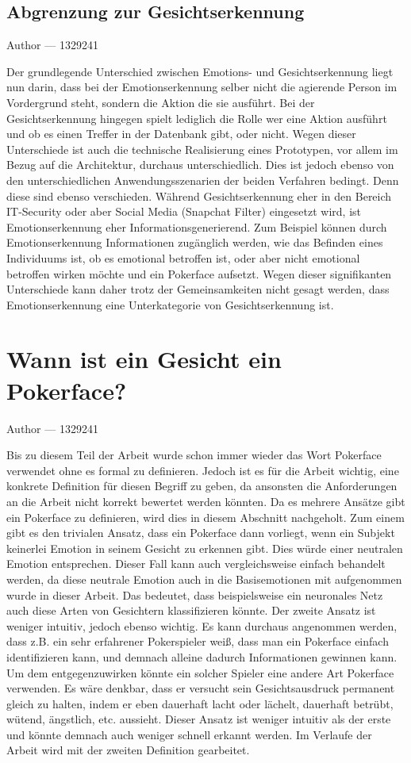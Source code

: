 \documentclass[12pt, a4paper]{report}
\makeatletter
\newcommand{\sectionauthor}[1]{%
  {\parindent0pt\vspace*{-5pt}%
  \large{Author --- }
  \linespread{1.1}\large\scshape#1%
  \par\nobreak\vspace*{35pt} }
  \@afterheading%
}
\makeatother
\begin{document}
\subsection{Abgrenzung zur Gesichtserkennung}
\sectionauthor{1329241}
Der grundlegende Unterschied zwischen Emotions- und Gesichtserkennung liegt nun darin, dass bei der Emotionserkennung selber nicht die agierende Person im Vordergrund steht, sondern die Aktion die sie ausführt. Bei der Gesichtserkennung hingegen spielt lediglich die Rolle wer eine Aktion ausführt und ob es einen Treffer in der Datenbank gibt, oder nicht. Wegen dieser Unterschiede ist auch die technische Realisierung eines Prototypen, vor allem im Bezug auf die Architektur,  durchaus unterschiedlich. Dies ist jedoch ebenso von den unterschiedlichen Anwendungsszenarien der beiden Verfahren bedingt.
Denn diese sind ebenso verschieden. Während Gesichtserkennung eher in den Bereich IT-Security oder aber Social Media (Snapchat Filter) eingesetzt wird, ist Emotionserkennung eher Informationsgenerierend.
Zum Beispiel können durch Emotionserkennung Informationen zugänglich werden, wie das Befinden eines Individuums ist, ob es emotional betroffen ist, oder aber nicht emotional betroffen wirken möchte und ein Pokerface aufsetzt.
Wegen dieser signifikanten Unterschiede kann daher trotz der Gemeinsamkeiten nicht gesagt werden, dass Emotionserkennung eine Unterkategorie von Gesichtserkennung ist.

\section{Wann ist ein Gesicht ein Pokerface?}
\sectionauthor{1329241}
\label{pokerface}
Bis zu diesem Teil der Arbeit wurde schon immer wieder das Wort Pokerface verwendet ohne es formal zu definieren. Jedoch ist es für die Arbeit wichtig, eine konkrete Definition für diesen Begriff zu geben, da ansonsten die Anforderungen an die Arbeit nicht korrekt bewertet werden könnten. Da es mehrere Ansätze gibt ein Pokerface zu definieren, wird dies in diesem Abschnitt nachgeholt. Zum einem gibt es den trivialen Ansatz, dass ein Pokerface dann vorliegt, wenn ein Subjekt keinerlei Emotion in seinem Gesicht zu erkennen gibt. Dies würde einer neutralen Emotion entsprechen. Dieser Fall kann auch vergleichsweise einfach behandelt werden, da diese neutrale Emotion auch in die Basisemotionen mit aufgenommen wurde in dieser Arbeit. Das bedeutet, dass beispielsweise ein neuronales Netz auch diese Arten von Gesichtern klassifizieren könnte. \newline
Der zweite Ansatz ist weniger intuitiv, jedoch ebenso wichtig. Es kann durchaus angenommen werden, dass z.B. ein sehr erfahrener Pokerspieler weiß, dass man ein Pokerface einfach identifizieren kann, und demnach alleine dadurch Informationen gewinnen kann. Um dem entgegenzuwirken könnte ein solcher Spieler eine andere Art Pokerface verwenden. Es wäre denkbar, dass er versucht sein Gesichtsausdruck permanent gleich zu halten, indem er eben dauerhaft lacht oder lächelt, dauerhaft betrübt, wütend, ängstlich, etc. aussieht. Dieser Ansatz ist weniger intuitiv als der erste und könnte demnach auch weniger schnell erkannt werden. Im Verlaufe der Arbeit wird mit der zweiten Definition gearbeitet.
\end{document}

